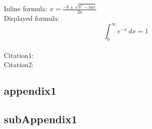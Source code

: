 \documentclass[11pt]{article} %
\begin{document}
\begin{multicols}{2}
Inline formula: $x = \frac{-b \pm \sqrt{b^2 - 4ac}}{2a}$
\\

Displayed formula:
\begin{equation} 
    \int_0^\infty e^{-x} \, dx = 1
\end{equation}
\\
Citation1: \cite{article1}
\\
Citation2: \cite{website1}

\end{multicols} %
\pagebreak


\setlength{\bibitemsep}{1em} %

\newpage

\begin{appendices}
    \section{appendix1}
        \begin{subappendices}
            \subsection{subAppendix1}
        \end{subappendices}
\end{appendices}
\end{document}
